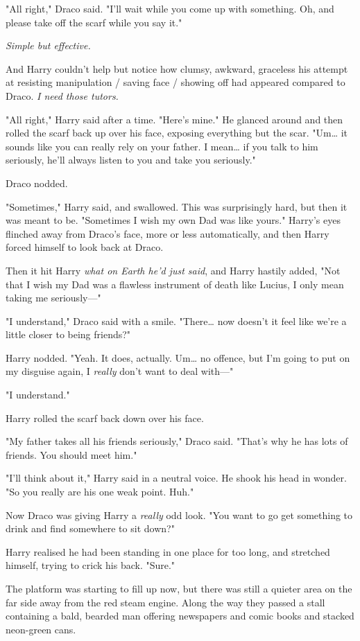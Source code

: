 "All right," Draco said. "I'll wait while you come up with something. Oh, and
please take off the scarf while you say it."

\emph{Simple but effective.}

And Harry couldn't help but notice how clumsy, awkward, graceless his attempt
at resisting manipulation / saving face / showing off had appeared compared to
Draco. \emph{I need those tutors.}

"All right," Harry said after a time. "Here's mine." He glanced around and then
rolled the scarf back up over his face, exposing everything but the scar.
"Um{\ldots} it sounds like you can really rely on your father. I mean{\ldots}
if you talk to him seriously, he'll always listen to you and take you
seriously."

Draco nodded.

"Sometimes," Harry said, and swallowed. This was surprisingly hard, but then it
was meant to be. "Sometimes I wish my own Dad was like yours." Harry's eyes
flinched away from Draco's face, more or less automatically, and then Harry
forced himself to look back at Draco.

Then it hit Harry \emph{what on Earth he'd just said}, and Harry hastily added,
"Not that I wish my Dad was a flawless instrument of death like Lucius, I only
mean taking me seriously---"

"I understand," Draco said with a smile. "There{\ldots} now doesn't it feel
like we're a little closer to being friends?"

Harry nodded. "Yeah. It does, actually. Um{\ldots} no offence, but I'm going to
put on my disguise again, I \emph{really} don't want to deal with---"

"I understand."

Harry rolled the scarf back down over his face.

"My father takes all his friends seriously," Draco said. "That's why he has
lots of friends. You should meet him."

"I'll think about it," Harry said in a neutral voice. He shook his head in
wonder. "So you really are his one weak point. Huh."

Now Draco was giving Harry a \emph{really} odd look. "You want to go get
something to drink and find somewhere to sit down?"

Harry realised he had been standing in one place for too long, and stretched
himself, trying to crick his back. "Sure."

The platform was starting to fill up now, but there was still a quieter area on
the far side away from the red steam engine. Along the way they passed a stall
containing a bald, bearded man offering newspapers and comic books and stacked
neon-green cans.

